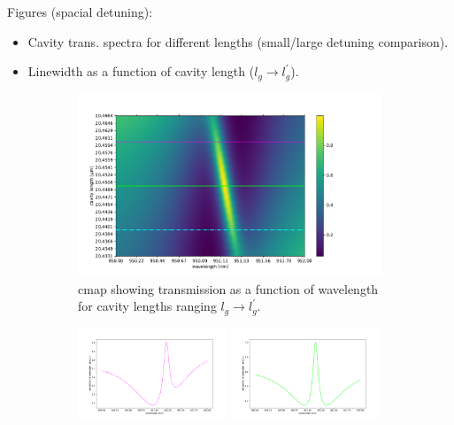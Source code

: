 Figures (spacial detuning):
\begin{itemize}
    \item Cavity trans. spectra for different lengths (small/large detuning comparison).
    \item Linewidth as a function of cavity length ($l_g \rightarrow l_g^{\prime}$).
\end{itemize}


\begin{figure}
    \centering
    \begin{subfigure}[c]{0.49\textwidth}
        \centering
        \includegraphics[width=\textwidth]{figures/cmap_with_slice_indicators1.pdf}
        \caption{cmap showing transmission as a function of wavelength for cavity lengths ranging $l_{g} \rightarrow l_{g}^{\prime}$.}
    \end{subfigure}
    \begin{subfigure}[c]{0.49\textwidth}
        \centering
        \includegraphics[width=0.49\textwidth]{figures/cmap_slice2.pdf}
        \newline
        \includegraphics[width=0.49\textwidth]{figures/cmap_slice1.pdf}

\end{subfigure}
\end{figure}
